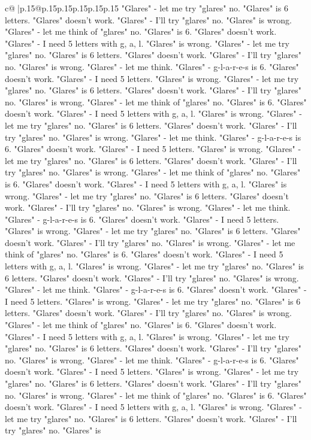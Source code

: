 \documentclass{article}
\begin{document}
{\begin{supertabular}{c@{$\;$}|p{.15\linewidth}@{}p{.15\linewidth}p{.15\linewidth}p{.15\linewidth}p{.15\linewidth}p{.15\linewidth}}
{{{"Glares" {-} let me try "glares" no. "Glares" is 6 letters. "Glares" doesn't work. "Glares" {-} I'll try "glares" no. "Glares" is wrong. "Glares" {-} let me think of "glares" no. "Glares" is 6. "Glares" doesn't work. "Glares" {-} I need 5 letters with g, a, l. "Glares" is wrong. "Glares" {-} let me try "glares" no. "Glares" is 6 letters. "Glares" doesn't work. "Glares" {-} I'll try "glares" no. "Glares" is wrong. "Glares" {-} let me think. "Glares" {-} g{-}l{-}a{-}r{-}e{-}s is 6. "Glares" doesn't work. "Glares" {-} I need 5 letters. "Glares" is wrong. "Glares" {-} let me try "glares" no. "Glares" is 6 letters. "Glares" doesn't work. "Glares" {-} I'll try "glares" no. "Glares" is wrong. "Glares" {-} let me think of "glares" no. "Glares" is 6. "Glares" doesn't work. "Glares" {-} I need 5 letters with g, a, l. "Glares" is wrong. "Glares" {-} let me try "glares" no. "Glares" is 6 letters. "Glares" doesn't work. "Glares" {-} I'll try "glares" no. "Glares" is wrong. "Glares" {-} let me think. "Glares" {-} g{-}l{-}a{-}r{-}e{-}s is 6. "Glares" doesn't work. "Glares" {-} I need 5 letters. "Glares" is wrong. "Glares" {-} let me try "glares" no. "Glares" is 6 letters. "Glares" doesn't work. "Glares" {-} I'll try "glares" no. "Glares" is wrong. "Glares" {-} let me think of "glares" no. "Glares" is 6. "Glares" doesn't work. "Glares" {-} I need 5 letters with g, a, l. "Glares" is wrong. "Glares" {-} let me try "glares" no. "Glares" is 6 letters. "Glares" doesn't work. "Glares" {-} I'll try "glares" no. "Glares" is wrong. "Glares" {-} let me think. "Glares" {-} g{-}l{-}a{-}r{-}e{-}s is 6. "Glares" doesn't work. "Glares" {-} I need 5 letters. "Glares" is wrong. "Glares" {-} let me try "glares" no. "Glares" is 6 letters. "Glares" doesn't work. "Glares" {-} I'll try "glares" no. "Glares" is wrong. "Glares" {-} let me think of "glares" no. "Glares" is 6. "Glares" doesn't work. "Glares" {-} I need 5 letters with g, a, l. "Glares" is wrong. "Glares" {-} let me try "glares" no. "Glares" is 6 letters. "Glares" doesn't work. "Glares" {-} I'll try "glares" no. "Glares" is wrong. "Glares" {-} let me think. "Glares" {-} g{-}l{-}a{-}r{-}e{-}s is 6. "Glares" doesn't work. "Glares" {-} I need 5 letters. "Glares" is wrong. "Glares" {-} let me try "glares" no. "Glares" is 6 letters. "Glares" doesn't work. "Glares" {-} I'll try "glares" no. "Glares" is wrong. "Glares" {-} let me think of "glares" no. "Glares" is 6. "Glares" doesn't work. "Glares" {-} I need 5 letters with g, a, l. "Glares" is wrong. "Glares" {-} let me try "glares" no. "Glares" is 6 letters. "Glares" doesn't work. "Glares" {-} I'll try "glares" no. "Glares" is wrong. "Glares" {-} let me think. "Glares" {-} g{-}l{-}a{-}r{-}e{-}s is 6. "Glares" doesn't work. "Glares" {-} I need 5 letters. "Glares" is wrong. "Glares" {-} let me try "glares" no. "Glares" is 6 letters. "Glares" doesn't work. "Glares" {-} I'll try "glares" no. "Glares" is wrong. "Glares" {-} let me think of "glares" no. "Glares" is 6. "Glares" doesn't work. "Glares" {-} I need 5 letters with g, a, l. "Glares" is wrong. "Glares" {-} let me try "glares" no. "Glares" is 6 letters. "Glares" doesn't work. "Glares" {-} I'll try "glares" no. "Glares" is }}}
\end{supertabular}}
\end{document}

